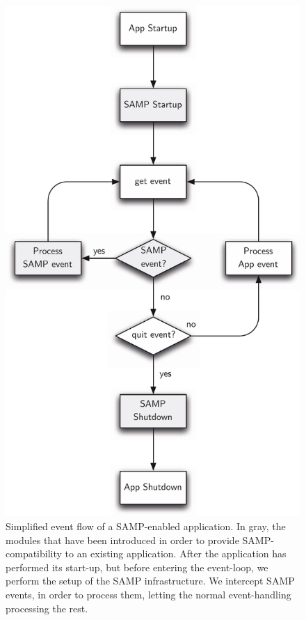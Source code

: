 		\begin{figure}[tbp]
			\centering
				\includegraphics[height=0.6\textheight]
				{fig/SAMPEnabledAppFlow.pdf}
			\caption[Simplified event flow of a SAMP-enabled
			application]
			{
				Simplified event flow of a SAMP-enabled application.
				In gray, the modules that have been introduced in
				order to provide SAMP-compatibility to an existing
				application.
				After the application has performed its start-up,
				but before entering the event-loop, we perform
				the setup of the SAMP infrastructure. We intercept
				SAMP events, in order to process them, letting the
				normal event-handling processing the rest.
			}
			\label{fig:fig_SAMPEnabledAppFlow}
		\end{figure}
		
